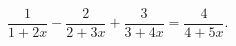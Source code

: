 \begin{ex}[type=equation]
	\begin{condition}
		$\dfrac{1 }{1+2x} - \dfrac{2}{2 + 3x} + \dfrac{3}{3 + 4x} = \dfrac{4}{4+ 5x}.$
	\end{condition}
\end{ex}